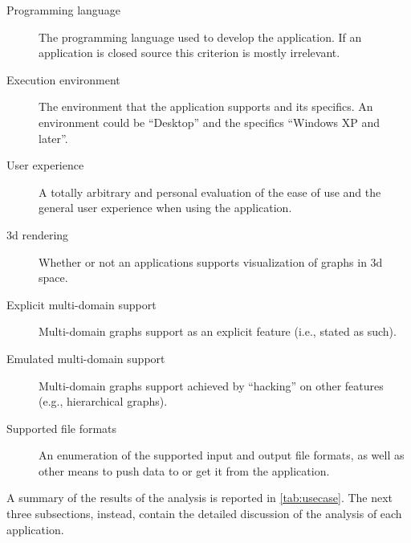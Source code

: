 \begin{description}
  \item[Programming language] The programming language used to develop the application. If an application is closed source this criterion is mostly irrelevant.
  \item[Execution environment] The environment that the application supports and its specifics. An environment could be ``Desktop'' and the specifics ``Windows XP and later''.
  \item[User experience] A totally arbitrary and personal evaluation of the ease of use and the general user experience when using the application.
\item[\gls{3d} rendering] Whether or not an applications supports visualization of graphs in \gls{3d} space.
  \item[Explicit multi-domain support] Multi-domain graphs support as an explicit feature (i.e., stated as such).
  \item[Emulated multi-domain support] Multi-domain graphs support achieved by ``hacking'' on other features (e.g., hierarchical graphs).
  \item[Supported file formats] An enumeration of the supported input and output file formats, as well as other means to push data to or get it from the application.
\end{description}

A summary of the results of the analysis is reported in \vref{tab:usecase}. The next three subsections, instead, contain the detailed discussion of the analysis of each application.

